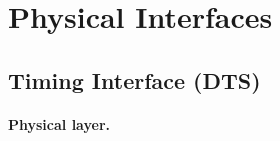 \section{Physical Interfaces}

\subsection{Timing Interface (DTS)}
\label{sec:physical-timing}

\paragraph{Physical layer.}

